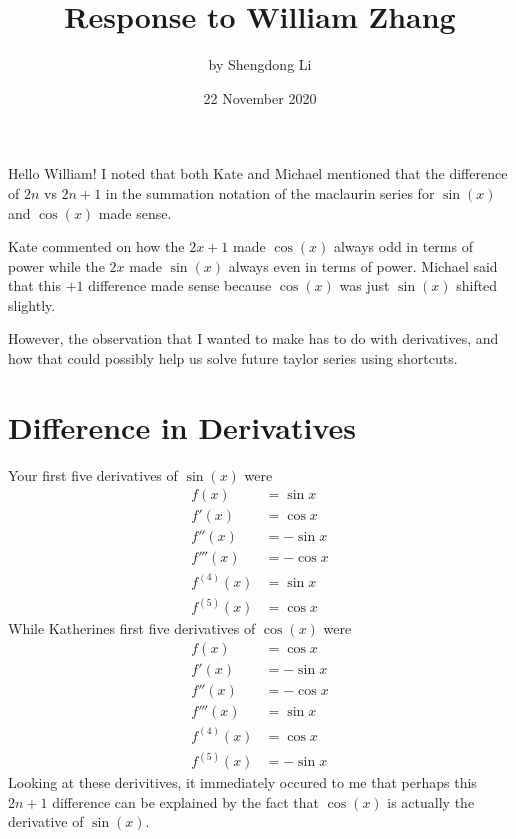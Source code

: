 \documentclass[12pt]{article}
\begin{document}
\title{Response to William Zhang}
\author{by Shengdong Li}
\date{22 November 2020}
\maketitle

Hello William!
I noted that both Kate and Michael mentioned that the difference of $2n$ vs $2n+1$ in the summation notation of the maclaurin series for $\sin(x)$ and $\cos(x)$ made sense. 

Kate commented on how the $2x+1$ made $\cos(x)$ always odd in terms of power while the $2x$ made $\sin(x)$ always even in terms of power. Michael said that this $+1$ difference made sense because $\cos(x)$ was just $\sin(x)$ shifted slightly.

However, the observation that I wanted to make has to do with derivatives, and how that could possibly help us solve future taylor series using shortcuts.

\section{Difference in Derivatives}
Your first five derivatives of $\sin(x)$ were
\begin{align}
  f\left(x\right)                  & =\sin x  \\
  f'\left(x\right)                 & =\cos x  \\
  f''\left(x\right)                & =-\sin x \\
  f'''\left(x\right)               & =-\cos x \\
  f^{\left(4\right)}\left(x\right) & =\sin x  \\
  f^{\left(5\right)}\left(x\right) & =\cos x
\end{align}
While Katherines first five derivatives of $\cos(x)$ were
\begin{align}
  f\left(x\right)                  & =\cos x  \\
  f'\left(x\right)                 & =-\sin x \\
  f''\left(x\right)                & =-\cos x \\
  f'''\left(x\right)               & =\sin x  \\
  f^{\left(4\right)}\left(x\right) & =\cos x  \\
  f^{\left(5\right)}\left(x\right) & =-\sin x
\end{align}
Looking at these derivitives, it immediately occured to me that perhaps this $2n+1$ difference can be explained by the fact that $\cos(x)$ is actually the derivative of $\sin(x)$.
\end{document}
